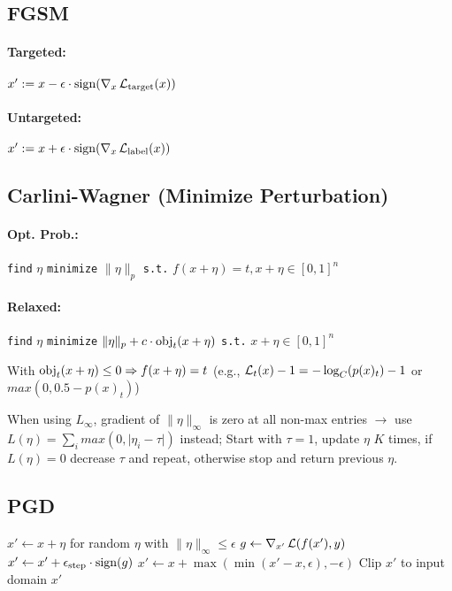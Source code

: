\subsection*{FGSM}
\paragraph{Targeted:} 
$x' := x - \epsilon \cdot \operatorname{sign}(\nabla_x \operatorname{\mathcal{L}}_\text{target}(x))$

\paragraph{Untargeted:}
$x' := x + \epsilon \cdot \operatorname{sign}(\nabla_x \operatorname{\mathcal{L}}_\text{label}(x))$

\subsection*{Carlini-Wagner (Minimize Perturbation)}
\paragraph{Opt. Prob.:} \texttt{find} $\eta$ \texttt{minimize} $\|\eta\|_p$ \texttt{s.t.} $f(x+\eta) =t, x+\eta \in [0,1]^n$
\paragraph{Relaxed:} \texttt{find} $\eta$ \texttt{minimize} $\|\eta\|_p + c \cdot \operatorname{obj}_t(x+\eta)$ \texttt{s.t.} $x+\eta \in [0,1]^n$

With $\operatorname{obj}_t(x+\eta) \le 0 \Rightarrow f(x+\eta) = t$ (e.g., $\operatorname{\mathcal{L}}_t(x) - 1 = -\log_C(p(x)_t) - 1$ or $max(0, 0.5- p(x)_t)$)

When using $L_\infty$, gradient of $\|\eta\|_\infty$ is zero at all non-max entries $\rightarrow$ use $L(\eta) = \sum_i max(0, \lvert \eta_i - \tau \rvert)$ instead; Start with $\tau=1$, update $\eta$ $K$ times, if $L(\eta) = 0$ decrease $\tau$ and repeat, otherwise stop and return previous $\eta$. 

\subsection*{PGD}

\begin{algorithmic}
\State $x' \gets x + \eta$ for random $\eta$ with $\|\eta\|_\infty \le \epsilon$
    \State $g \gets \nabla_{x'} \operatorname{\mathcal{L}}(f(x'), y)$ 
    \State $x' \gets x' +  \epsilon_\text{step} \cdot \operatorname{sign}(g)$ 
    \State $x' \gets x + \max(\min(x'-x, \epsilon), -\epsilon)$
    \State Clip $x'$ to input domain 
\EndFor
\State \Return $x'$
\EndFunction
\end{algorithmic}

